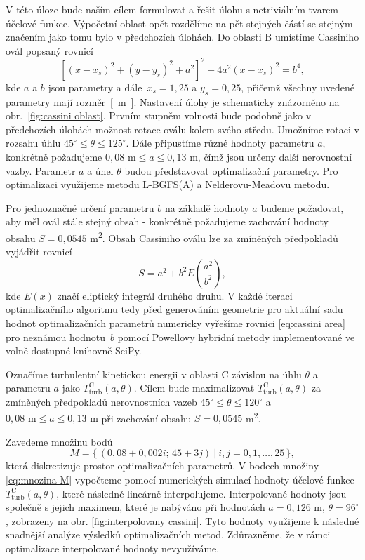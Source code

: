 \newpage

V této úloze bude naším cílem formulovat a řešit úlohu s netriviálním tvarem účelové funkce. Výpočetní oblast opět rozdělíme na pět stejných částí se stejným značením jako tomu bylo v předchozích úlohách. Do oblasti B umístíme Cassiniho ovál popsaný rovnicí
\begin{equation}
\left[(x-x_s)^2 + (y-y_s)^2 + a^2 \right] ^2 - 4a^2(x-x_s)^2 = b^4,
\end{equation}
kde $ a $ a $ b $ jsou parametry a dále $\, x_s = 1{,}25$ a $ y_s = 0{,}25 $, přičemž všechny uvedené parametry mají rozměr~\si{[m]}. Nastavení úlohy je schematicky znázorněno na obr.~\ref{fig:cassini oblast}. Prvním stupněm volnosti bude podobně jako v předchozích úlohách možnost rotace oválu kolem svého středu. Umožníme rotaci v rozsahu úhlu $45^\circ \leq \theta \leq 125^\circ$. Dále připustíme různé hodnoty parametru $ a $, konkrétně požadujeme \mbox{$0{,}08 \text{ m} \leq a \leq 0{,}13 \text{ m}$}, čímž jsou určeny další nerovnostní vazby. Parametr $ a $ a úhel $ \theta $ budou představovat optimalizační parametry. Pro optimalizaci využijeme metodu L-BGFS(A) a Nelderovu-Meadovu metodu.

Pro jednoznačné určení parametru $ b $ na základě hodnoty $ a $ budeme požadovat, aby měl ovál stále stejný obsah - konkrétně požadujeme zachování hodnoty obsahu $ S = 0{,}0545 $ \si{m^2}. Obsah Cassiniho oválu lze za zmíněných předpokladů vyjádřit rovnicí \cite{Cassini}
\begin{equation}\label{eq:cassini area}
S = a^2 + b^2 E\left(\frac{a^2}{b^2}\right),
\end{equation}
kde $ E(x) $ značí eliptický integrál druhého druhu. V každé iteraci optimalizačního algoritmu tedy před generováním geometrie pro aktuální sadu hodnot optimalizačních parametrů numericky vyřešíme rovnici \ref{eq:cassini area} pro neznámou hodnotu~$ b $ pomocí Powellovy hybridní metody implementované ve volně dostupné knihovně SciPy.

Označíme turbulentní kinetickou energii v oblasti C závislou na úhlu $ \theta $ a parametru $ a $ jako $ T^{\text{C}}_{\text{turb}} (a, \theta) $. Cílem bude maximalizovat $ T^{\text{C}}_{\text{turb}} (a, \theta) $ za zmíněných předpokladů nerovnostních vazeb \mbox{$45^\circ \leq \theta \leq 120^\circ$} a \mbox{$0{,}08 \text{ m} \leq a \leq 0{,}13 \text{ m}$} při zachování obsahu $ S = 0{,}0545 $ \si{m^2}.

Zavedeme množinu bodů
\begin{equation}\label{eq:mnozina M}
	M = \big\{ \, (0{,}08 + 0{,}002i; \, 45 + 3j) \: \big| \: i,j = 0, 1, \dots, 25 \,  \big\},
\end{equation}
která diskretizuje prostor optimalizačních parametrů. V bodech množiny \ref{eq:mnozina M} vypočteme pomocí numerických simulací hodnoty účelové funkce $ T^{\text{C}}_{\text{turb}} (a, \theta) $, které následně lineárně interpolujeme. Interpolované hodnoty jsou společně s jejich maximem, které je nabýváno při hodnotách $ a = 0{,}126 $ m, $ \theta = 96^\circ $, zobrazeny na obr. \ref{fig:interpolovany cassini}. Tyto hodnoty využijeme k následné snadnější analýze výsledků optimalizačních metod. Zdůrazněme, že v rámci optimalizace interpolované hodnoty nevyužíváme.


